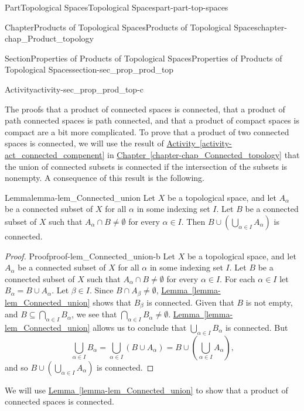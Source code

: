 \documentclass[oneside,10pt,]{book}
\newcommand{\xreffont}{\relax}
\numberwithin{equation}{chapter}
\begin{document}
\begin{partptx}{Part}{Topological Spaces}{}{Topological Spaces}{}{}{part-part-top-spaces}
\begin{chapterptx}{Chapter}{Products of Topological Spaces}{}{Products of Topological Spaces}{}{}{chapter-chap_Product_topology}
\begin{sectionptx}{Section}{Properties of Products of Topological Spaces}{}{Properties of Products of Topological Spaces}{}{}{section-sec_prop_prod_top}
\begin{activity}{Activity}{}{activity-sec_prop_prod_top-c}
\begin{enumerate}[font=\bfseries,label=(\alph*),ref=\alph*]
\end{enumerate}%
\end{activity}%
The proofs that a product of connected spaces is connected, that a product of path connected spaces is path connected, and that a product of compact spaces is compact are a bit more complicated. To prove that a product of two connected spaces is connected, we will use the result of \hyperref[activity-act_connected_compenent]{Activity~{\xreffont\ref{activity-act_connected_compenent}}} in \hyperref[chapter-chap_Connected_topology]{Chapter~{\xreffont\ref{chapter-chap_Connected_topology}}} that the union of connected subsets is connected if the intersection of the subsets is nonempty. A consequence of this result is the following.%
\begin{lemma}{Lemma}{}{}{lemma-lem_Connected_union}%
Let \(X\) be a topological space, and let \(A_{\alpha}\) be a connected subset of \(X\) for all \(\alpha\) in some indexing set \(I\). Let \(B\) be a connected subset of \(X\) such that \(A_{\alpha} \cap B \neq \emptyset\) for every \(\alpha \in I\). Then \(B \cup \left(\bigcup_{\alpha \in I} A_{\alpha} \right)\) is connected.%
\end{lemma}
\begin{proof}{Proof}{}{proof-lem_Connected_union-b}
Let \(X\) be a topological space, and let \(A_{\alpha}\) be a connected subset of \(X\) for all \(\alpha\) in some indexing set \(I\). Let \(B\) be a connected subset of \(X\) such that \(A_{\alpha} \cap B \neq \emptyset\) for every \(\alpha \in I\). For each \(\alpha \in I\) let \(B_{\alpha} = B \cup A_{\alpha}\). Let \(\beta \in I\). Since \(B \cap A_{\beta} \neq \emptyset\), \hyperref[lemma-lem_Connected_union]{Lemma~{\xreffont\ref{lemma-lem_Connected_union}}} shows that \(B_{\beta}\) is connected. Given that \(B\) is not empty, and \(B \subseteq \bigcap_{\alpha \in I} B_{\alpha}\), we see that \(\bigcap_{\alpha \in I} B_{\alpha} \neq \emptyset\). \hyperref[lemma-lem_Connected_union]{Lemma~{\xreffont\ref{lemma-lem_Connected_union}}} allows us to conclude that \(\bigcup_{\alpha \in I} B_{\alpha}\) is connected. But%
\begin{equation*}
\bigcup_{\alpha \in I} B_{\alpha} = \bigcup_{\alpha \in I} (B \cup A_{\alpha}) = B \cup \left(\bigcup_{\alpha \in I} A_{\alpha}\right)\text{,}
\end{equation*}
and so \(B \cup \left(\bigcup_{\alpha \in I} A_{\alpha}\right)\) is connected.%
\end{proof}
We will use \hyperref[lemma-lem_Connected_union]{Lemma~{\xreffont\ref{lemma-lem_Connected_union}}} to show that a product of connected spaces is connected.%

\end{sectionptx}
\end{chapterptx}
\end{partptx}
\end{document}
